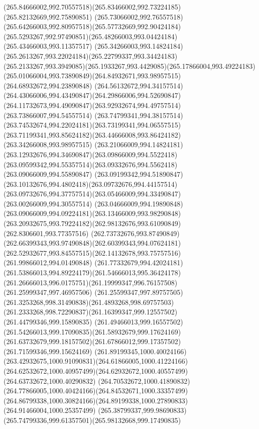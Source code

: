 {{\curveto(265.84666002,992.70557518)(265.83466002,992.73224185)(265.82132669,992.75890851)
\curveto(265.73066002,992.76557518)(265.64266003,992.80957518)(265.57732669,992.90424184)
\curveto(265.5293267,992.97490851)(265.48266003,993.04424184)(265.43466003,993.11357517)
\curveto(265.34266003,993.14824184)(265.2613267,993.22024184)(265.22799337,993.34424183)
\curveto(265.2133267,993.3949085)(265.1933267,993.4429085)(265.17866004,993.49224183)
\curveto(265.01066004,993.73890849)(264.84932671,993.98957515)(264.68932672,994.23890848)
\curveto(264.56132672,994.34157514)(264.43066006,994.43490847)(264.29866006,994.52690847)
\curveto(264.11732673,994.49090847)(263.92932674,994.49757514)(263.73866007,994.54557514)
\curveto(263.74799341,994.38157514)(263.74532674,994.22024181)(263.73199341,994.06557515)
\curveto(263.71199341,993.85624182)(263.44666008,993.86424182)(263.34266008,993.98957515)
\curveto(263.21066009,994.14824181)(263.12932676,994.34690847)(263.09866009,994.5522418)
\curveto(263.09599342,994.55357514)(263.09332676,994.5562418)(263.09066009,994.55890847)
\curveto(263.09199342,994.51890847)(263.10132676,994.4802418)(263.09732676,994.44157514)
\curveto(263.09732676,994.37757514)(263.05466009,994.33490847)(263.00266009,994.30557514)
\curveto(263.04666009,994.19890848)(263.09066009,994.09224181)(263.13466009,993.98290848)
\curveto(263.20932675,993.79224182)(262.98132676,993.61090849)(262.8306601,993.77357516)
\curveto(262.73732676,993.87490849)(262.66399343,993.97490848)(262.60399343,994.07624181)
\curveto(262.52932677,993.84557515)(262.14132678,993.75757516)(261.99866012,994.01490848)
\curveto(261.77332679,994.42024181)(261.53866013,994.89224179)(261.54666013,995.36424178)
\curveto(261.26666013,996.0175751)(261.19999347,996.76157508)(261.25999347,997.46957506)
\curveto(261.25599347,997.89757505)(261.3253268,998.31490838)(261.4893268,998.69757503)
\curveto(261.2333268,998.72290837)(261.16399347,999.12557502)(261.44799346,999.15890835)
\curveto(261.49466013,999.16557502)(261.54266013,999.17090835)(261.58932679,999.17624169)
\curveto(261.63732679,999.18157502)(261.67866012,999.17357502)(261.71599346,999.15624169)
\curveto(261.89199345,1000.40024166)(263.42932675,1000.91090831)(264.61866005,1000.41224166)
\curveto(264.62532672,1000.40957499)(264.62932672,1000.40557499)(264.63732672,1000.40290832)
\curveto(264.70532672,1000.41890832)(264.77866005,1000.40424166)(264.84532671,1000.33357499)
\curveto(264.86799338,1000.30824166)(264.89199338,1000.27890833)(264.91466004,1000.25357499)
\curveto(265.38799337,999.98690833)(265.74799336,999.61357501)(265.98132668,999.17490835)
}}
